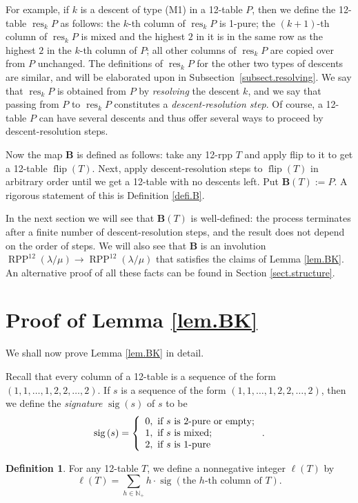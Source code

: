 \documentclass[12pt]{article}
\theoremstyle{plain}
\theoremstyle{definition}
\newtheorem{definition}[theorem]{Definition}
\let\sumnonlimits\sum
\renewcommand{\sum}{\sumnonlimits\limits}
\def\B{{\mathbf{B}}}
\def\OneTwoRPP{{\operatorname{RPP}^{12}\left(  \lambda/\mu\right)}}
\def\flip{{\operatorname{flip}}}
\begin{document}
\def\resk{{\operatorname{res}_{k}}}

For example, if $k$ is a descent of type (M1) in a 12-table $P$, then we define the 12-table $\resk P$ as follows: the $k$-th column of $\resk P$ is 1-pure; the $\left(  k+1\right)  $-th column of $\resk P$ is mixed and the highest $2$ in it is in the same row as the highest $2$ in the $k$-th column of $P$; all other columns of $\resk P$ are
copied over from $P$ unchanged. The definitions of $\resk P$ for the other two types of descents are similar, and will be elaborated upon in Subsection~\ref{subsect.resolving}. We say that $\resk P$ is obtained from $P$ by \textit{resolving} the descent $k$, and we say that passing from $P$ to $\resk P$ constitutes a \textit{descent-resolution step}. Of course, a 12-table $P$ can have several descents and thus offer several ways to proceed by descent-resolution steps.

Now the map $\B$ is defined as follows: take any 12-rpp $T$ and apply flip to it to get a 12-table $\flip(T)$. Next, apply descent-resolution steps to $\flip(T)$ in arbitrary order until we get a 12-table with no descents left. Put $\B(T):=P$. A rigorous statement of this is Definition \ref{defi.B}.

In the next section we will see that $\B(T)$ is well-defined: the process terminates after a finite number of descent-resolution steps, and the result does not depend on the order of steps. We will also see that $\B$ is an involution $\OneTwoRPP\to\OneTwoRPP$ that satisfies the claims of Lemma \ref{lem.BK}. An alternative proof of all these facts can be found in Section \ref{sect.structure}.



\section{\label{sect.proof}Proof of Lemma \ref{lem.BK}}

We shall now prove Lemma \ref{lem.BK} in detail.

Recall that every column of a 12-table
is a sequence of the form $(1,1,\ldots,1,2,2,\ldots,2)$. If $s$ is a sequence of the form $(1,1,\ldots,1,2,2,\ldots,2)$, then we define the
\textit{signature} $\operatorname*{sig}\left(  s\right)
$ of $s$ to be
\[
\operatorname*{sig}\left(  s\right) = \left\{
\begin{array}
[c]{l}%
0,\text{ if }s\text{ is 2-pure or empty;}\\
1,\text{ if }s\text{ is mixed;}\\
2,\text{ if }s\text{ is 1-pure}%
\end{array}
\right.
.
\]
\begin{definition}
 \label{defi.fourtypes}
For any 12-table $T$, we define a nonnegative integer $\ell\left(
T\right)  $ by%
\[
\ell\left(  T\right)  =\sum_{h\in\mathbb{N}_{+}}h\cdot\operatorname*{sig}%
\left(  \text{the }h\text{-th column of }T\right)  .
\]
\end{definition}
\end{document}

